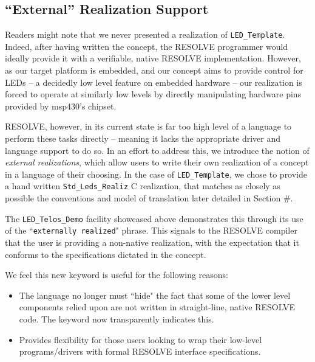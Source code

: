 \subsection{``External'' Realization Support}
\label{ssec:external}

Readers might note that we never presented a realization of \texttt{LED\_Template}. Indeed, after having written the concept, the RESOLVE programmer would ideally provide it with a verifiable, native RESOLVE implementation. However, as our target platform is embedded, and our concept aims to provide control for LEDs -- a decidedly low level feature on embedded hardware -- our realization is forced to operate at similarly low levels by directly manipulating hardware pins provided by msp430's chipset. 

RESOLVE, however, in its current state is far too high level of a language to perform these tasks directly -- meaning it lacks the appropriate driver and language support to do so. In an effort to address this, we introduce the notion of \textit{external realizations}, which allow users to write their own realization of a concept in a language of their choosing. In the case of \texttt{LED\_Template}, we chose to provide a hand written \texttt{Std\_Leds\_Realiz} C realization, that matches as closely as possible the conventions and model of translation later detailed in Section \#. 

The \texttt{LED\_Telos\_Demo} facility showcased above demonstrates this through its use of the ``\texttt{externally realized}" phrase. This signals to the RESOLVE compiler that the user is providing a non-native realization, with the expectation that it conforms to the specifications dictated in the concept. 




We feel this new keyword is useful for the following reasons:
\begin{itemize}
\item The language no longer must ``hide" the fact that some of the lower level components relied upon are not written in straight-line, native RESOLVE code. The keyword now transparently indicates this.
\item Provides flexibility for those users looking to wrap their low-level programs/drivers with formal RESOLVE interface specifications.
\end{itemize}

